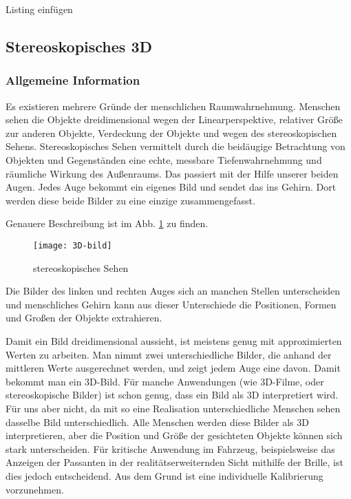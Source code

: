     Listing einfügen



\subsection{Stereoskopisches 3D}
\label{sec:Stereoskopisches 3D}
\subsubsection{Allgemeine Information}
Es existieren mehrere Gründe der menschlichen Raumwahrnehmung.
Menschen sehen die Objekte dreidimensional wegen der Linearperspektive, relativer Größe zur anderen Objekte, Verdeckung der Objekte und wegen des stereoskopischen Sehens. 
Stereoskopisches Sehen vermittelt durch die beidäugige Betrachtung von Objekten und Gegenständen eine echte, messbare Tiefenwahrnehmung und räumliche Wirkung des Außenraums. 
Das passiert mit der Hilfe unserer beiden Augen.
Jedes Auge bekommt ein eigenes Bild und sendet das ins Gehirn. 
Dort werden diese beide Bilder zu eine einzige zusammengefasst.

Genauere Beschreibung ist im Abb. \ref{fig:3D} zu finden.

\begin{figure}[h]
   \centering
   \texttt{[image: 3D-bild]}
   \caption{stereoskopisches Sehen}
   \label{fig:3D}
\end{figure}

Die Bilder des linken und rechten Auges sich an manchen Stellen unterscheiden und menschliches Gehirn kann aus dieser Unterschiede die Positionen, Formen und Großen der Objekte extrahieren.

Damit ein Bild dreidimensional aussieht, ist meistens genug mit approximierten Werten zu arbeiten.
Man nimmt zwei unterschiedliche Bilder, die anhand der mittleren Werte ausgerechnet werden, und zeigt jedem Auge eine davon. 
Damit bekommt man ein 3D-Bild. 
Für manche Anwendungen (wie 3D-Filme, oder stereoskopische Bilder) ist schon genug,  dass ein Bild als 3D interpretiert wird. 
Für uns aber nicht, da mit so eine Realisation unterschiedliche Menschen sehen dasselbe Bild unterschiedlich.
Alle Menschen werden diese Bilder als 3D interpretieren, aber die Position und Größe der gesichteten Objekte können sich stark unterscheiden. Für kritische Anwendung im Fahrzeug, beispielsweise das Anzeigen der Passanten in der realitätserweiternden Sicht mithilfe der Brille, ist dies jedoch entscheidend. Aus dem Grund ist eine individuelle Kalibrierung vorzunehmen.


